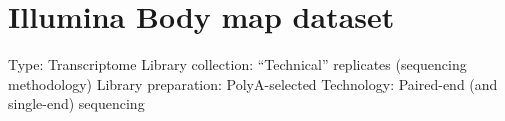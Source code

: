 \chapter{Illumina Body map dataset}
\label{ch:IBMData}


Type: Transcriptome
Library collection: ``Technical'' replicates (sequencing methodology)
Library preparation: PolyA-selected
Technology: Paired-end (and single-end) sequencing






